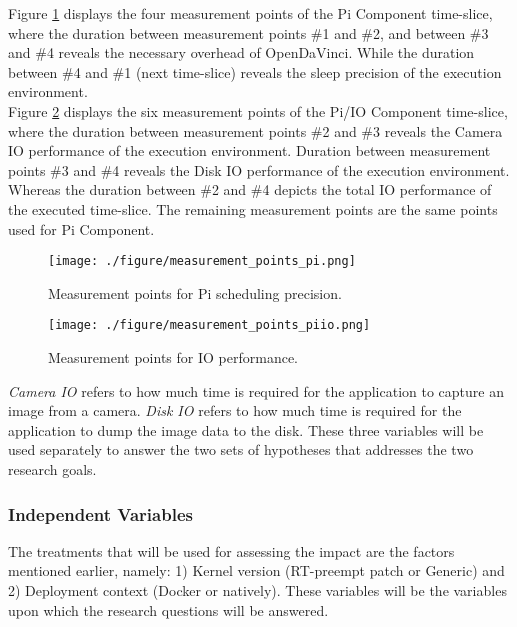 Figure \ref{pi_measure} displays the four measurement points of the Pi Component time-slice, where the duration between measurement points \#1 and \#2, and between \#3 and \#4 reveals the necessary overhead of OpenDaVinci. While the duration between \#4 and \#1 (next time-slice) reveals the sleep precision of the execution environment.\\

Figure \ref{piio_measure} displays the six measurement points of the Pi/IO Component time-slice, where the duration between measurement points \#2 and \#3 reveals the Camera IO performance of the execution environment. Duration between measurement points \#3 and \#4 reveals the Disk IO performance of the execution environment. Whereas the duration between \#2 and \#4 depicts the total IO performance of the executed time-slice. The remaining measurement points are the same points used for Pi Component.\\


\begin{figure}[ht]
\centering
     \texttt{[image: ./figure/measurement\_points\_pi.png]}
      \caption{Measurement points for Pi scheduling precision.}
       \label{pi_measure}
\end{figure}

\begin{figure}[ht]
\centering
     \texttt{[image: ./figure/measurement\_points\_piio.png]}
      \caption{Measurement points for IO performance.}
       \label{piio_measure}
\end{figure}

 \textit{Camera IO} refers to how much time is required for the application to capture an image from a camera. \textit{Disk IO} refers to how much time is required for the application to dump the image data to the disk. These three variables will be used separately to answer the two sets of hypotheses that addresses the two research goals. 

\subsubsection{Independent Variables}
The treatments that will be used for assessing the impact are the factors mentioned earlier, namely: 1) Kernel version (RT-preempt patch or Generic) and 2) Deployment context (Docker or natively). These variables will be the variables upon which the research questions will be answered.

